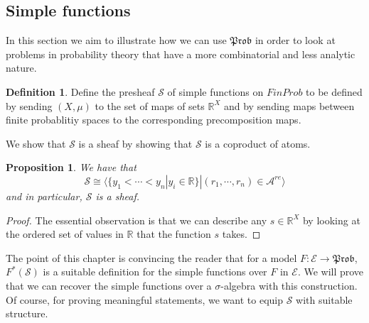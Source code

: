 \documentclass[a4paper]{amsproc}
\theoremstyle{plain}
\newtheorem{proposition}[theorem]{Proposition}
\theoremstyle{definition}
\newtheorem{definition}[theorem]{Definition}
\theoremstyle{remark}
\numberwithin{equation}{section}
\begin{document}
\subsection{Simple functions} \label{simple_functions}

In this section we aim to illustrate how we can use $\mathfrak{Prob}$ in order to look at problems in probability theory that have a more combinatorial and less analytic nature. 


\begin{definition}
    Define the presheaf $\mathcal{S}$ of simple functions on $FinProb$ to be defined by sending $(X,\mu)$ to the set of maps of sets $\mathbb{R}^X$ and by sending maps between finite probablitiy spaces to the corresponding precomposition maps.
\end{definition}

We show that $\mathcal{S}$ is a sheaf by showing that $\mathcal{S}$ is a coproduct of atoms.

\begin{proposition}
    We have that
    \[
        \mathcal{S} \cong \langle \{y_1 < \cdots < y_n | y_i \in \mathbb{R} \} | (r_1, \cdots, r_n) \in \mathcal{A}^{re} \rangle
    \]
    and in particular, $\mathcal{S}$ is a sheaf.
\end{proposition}
\begin{proof}
    The essential observation is that we can describe any $s \in \mathbb{R}^X$ by looking at the ordered set of values in $\mathbb{R}$ that the function $s$ takes.
\end{proof}


The point of this chapter is convincing the reader that for a model $F: \mathcal{E} \to \mathfrak{Prob}$, $F^*(\mathcal{S})$ is a suitable definition for the simple functions over $F$ in $\mathcal{E}$. We will prove that we can recover the simple functions over a $\sigma$-algebra with this construction. Of course, for proving meaningful statements, we want to equip $\mathcal{S}$ with suitable structure.
\end{document}

